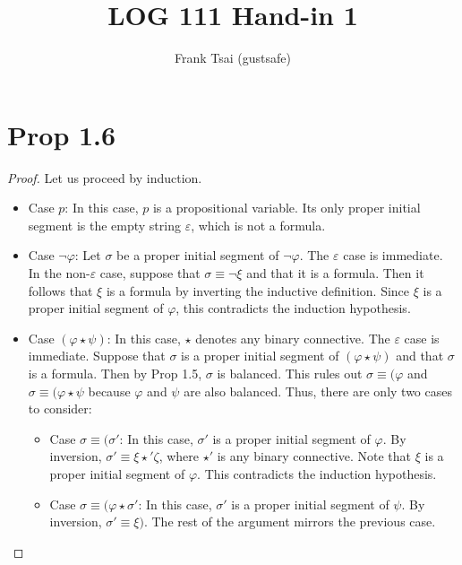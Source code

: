 \documentclass[a4paper]{article}
\title{LOG 111 Hand-in 1}
\author{Frank Tsai (gustsafe)}
\begin{document}
\maketitle

\section{Prop 1.6}
\begin{proof}
  Let us proceed by induction.
  \begin{itemize}
  \item Case $p$: In this case, $p$ is a propositional variable.
    Its only proper initial segment is the empty string $\varepsilon$, which is not a formula.

  \item Case $\lnot\varphi$: Let $\sigma$ be a proper initial segment of $\lnot\varphi$.
    The $\varepsilon$ case is immediate.
    In the non-$\varepsilon$ case, suppose that $\sigma \equiv \lnot\xi$ and that it is a formula.
    Then it follows that $\xi$ is a formula by inverting the inductive definition.
    Since $\xi$ is a proper initial segment of $\varphi$, this contradicts the induction hypothesis.

  \item Case $(\varphi \star \psi)$: In this case, $\star$ denotes any binary connective.
    The $\varepsilon$ case is immediate.
    Suppose that $\sigma$ is a proper initial segment of $(\varphi \star \psi)$ and that $\sigma$ is a formula.
    Then by Prop 1.5, $\sigma$ is balanced.
    This rules out $\sigma \equiv (\varphi$ and $\sigma \equiv (\varphi \star \psi$ because $\varphi$ and $\psi$ are also balanced.
    Thus, there are only two cases to consider:
    \begin{itemize}
    \item Case $\sigma \equiv (\sigma'$: In this case, $\sigma'$ is a proper initial segment of $\varphi$.
      By inversion, $\sigma' \equiv \xi \star' \zeta$, where $\star'$ is any binary connective.
      Note that $\xi$ is a proper initial segment of $\varphi$.
      This contradicts the induction hypothesis.
    \item Case $\sigma \equiv (\varphi \star \sigma'$: In this case, $\sigma'$ is a proper initial segment of $\psi$.
      By inversion, $\sigma' \equiv \xi)$.
      The rest of the argument mirrors the previous case. \qedhere
    \end{itemize}
  \end{itemize}
\end{proof}
\end{document}

